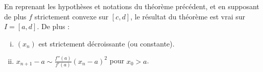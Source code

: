 	\begin{corollary}
		En reprenant les hypothèses et notations du théorème précédent, et en supposant de plus $f$ strictement convexe sur $[c, d]$, le résultat du théorème est vrai sur $I = [a, d]$. De plus :
		\begin{enumerate}[(i)]
			\item $(x_n)$ est strictement décroissante (ou constante).
			\item $x_{n+1} - a \sim \frac{f''(a)}{f'(a)} (x_n - a)^2$ pour $x_0 > a$.
		\end{enumerate}
	\end{corollary}

